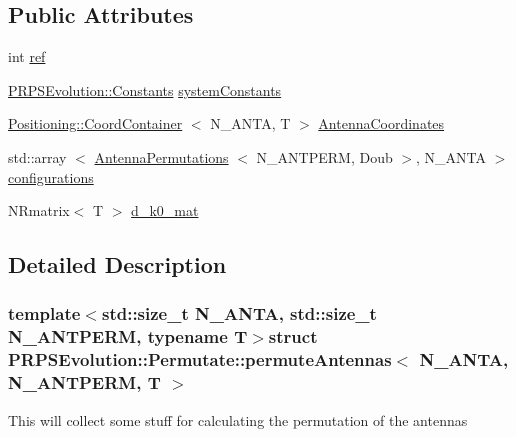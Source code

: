 \subsection*{\-Public \-Attributes}
\begin{DoxyCompactItemize}
\item 
int \hyperlink{struct_p_r_p_s_evolution_1_1_permutate_1_1permute_antennas_a21e29b21d0c2cc612a06857da0127621}{ref}
\item 
\hyperlink{struct_p_r_p_s_evolution_1_1_constants}{\-P\-R\-P\-S\-Evolution\-::\-Constants} \hyperlink{struct_p_r_p_s_evolution_1_1_permutate_1_1permute_antennas_a85d40e6357f5cff5265a2899392cd865}{system\-Constants}
\item 
\hyperlink{struct_p_r_p_s_evolution_1_1_positioning_1_1_coord_container}{\-Positioning\-::\-Coord\-Container}\*
$<$ \-N\-\_\-\-A\-N\-T\-A, \-T $>$ \hyperlink{struct_p_r_p_s_evolution_1_1_permutate_1_1permute_antennas_a56226c0c761aaa257d0eaa701b19c835}{\-Antenna\-Coordinates}
\item 
std\-::array\*
$<$ \hyperlink{struct_p_r_p_s_evolution_1_1_permutate_1_1_antenna_permutations}{\-Antenna\-Permutations}\*
$<$ \-N\-\_\-\-A\-N\-T\-P\-E\-R\-M, \-Doub $>$, \-N\-\_\-\-A\-N\-T\-A $>$ \hyperlink{struct_p_r_p_s_evolution_1_1_permutate_1_1permute_antennas_a98128f0b9e99559dc537c67b200ec18c}{configurations}
\item 
\-N\-Rmatrix$<$ \-T $>$ \hyperlink{struct_p_r_p_s_evolution_1_1_permutate_1_1permute_antennas_a255cd80ec5b4dfb6c2c318df1e052c80}{d\-\_\-k0\-\_\-mat}
\end{DoxyCompactItemize}


\subsection{\-Detailed \-Description}
\subsubsection*{template$<$std\-::size\-\_\-t \-N\-\_\-\-A\-N\-T\-A, std\-::size\-\_\-t \-N\-\_\-\-A\-N\-T\-P\-E\-R\-M, typename \-T$>$struct P\-R\-P\-S\-Evolution\-::\-Permutate\-::permute\-Antennas$<$ N\-\_\-\-A\-N\-T\-A, N\-\_\-\-A\-N\-T\-P\-E\-R\-M, T $>$}

\-This will collect some stuff for calculating the permutation of the antennas 

